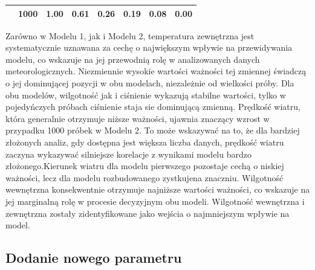 \documentclass[a4paper,twoside,12pt]{book}
\begin{document}
\begin{table}[!h]
{\begin{tabular}{|c|c|c|c|c|c|c|c|}
                                                                         & 1000                                                   & 1.00                                                              & 0.61                                                             & 0.26                                                              & 0.19                                                      & 0.08                                                      & 0.00                                                            \\ \hline
    \end{tabular}
  }
\end{table}

Zarówno w Modelu 1, jak i Modelu 2, temperatura zewnętrzna jest systematycznie uznawana za cechę o największym wpływie na przewidywania modelu, co wskazuje na jej przewodnią rolę w analizowanych danych meteorologicznych. Niezmiennie wysokie wartości ważności tej zmiennej świadczą o jej dominującej pozycji w obu modelach, niezależnie od wielkości próby. Dla obu modelów, wilgotność jak i ciśnienie wykazują stabilne wartości, tylko w pojedyńczych próbach ciśnienie staja sie dominującą zmienną.
Prędkość wiatru, która generalnie otrzymuje niższe ważności, ujawnia znaczący wzrost w przypadku 1000 próbek w Modelu 2. To może wskazywać na to, że dla bardziej złożonych analiz, gdy dostępna jest większa liczba danych, prędkość wiatru zaczyna wykazywać silniejsze korelacje z wynikami modelu bardzo złożonego.Kierunek wiatru dla modelu pierwszego pozostaje cechą o niskiej ważności, lecz dla modelu rozbudowanego zystkujena znaczniu. Wilgotność wewnętrzna konsekwentnie otrzymuje najniższe wartości ważności, co wskazuje na jej marginalną rolę w procesie decyzyjnym obu modeli. Wilgotność wewnętrzna i zewnętrzna zostały zidentyfikowane jako wejścia o najmniejszym wpływie na model.

\subsection{Dodanie nowego parametru}
\end{document}
